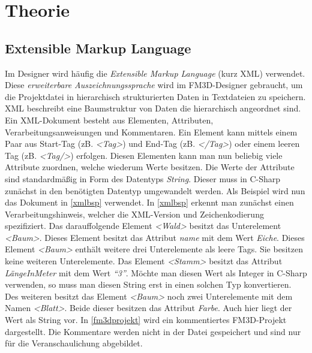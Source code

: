 \chapter{Theorie}
\label{theorie}




\section[Extensible Markup Language]{Extensible Markup Language\cite{xml}\cite{xmlcstutorials}\cite{msdn}}
\label{extensiblemarkuplanguage}

Im Designer wird häufig die \textit{Extensible Markup Language} (kurz \ac{XML}) verwendet.  Diese \textit{erweiterbare Auszeichnungssprache} wird im FM3D-Designer gebraucht, um die Projektdatei in hierarchisch strukturierten Daten in Textdateien zu speichern.
\ac{XML} beschreibt eine Baumstruktur von Daten die hierarchisch angeordnet sind. Ein \ac{XML}-Dokument besteht aus Elementen, Attributen, Verarbeitungsanweisungen und Kommentaren. 
Ein Element kann mittels einem Paar aus Start-Tag (zB. \textit{<Tag>}) und End-Tag (zB. \textit{</Tag>}) oder einem leeren Tag (zB. \textit{<Tag/>}) erfolgen.
Diesen Elementen kann man nun beliebig viele Attribute zuordnen, welche wiederum Werte besitzen.
Die Werte der Attribute sind standardmäßig in Form des Datentyps \textit{String}. Dieser muss in C-Sharp zunächst in den benötigten Datentyp umgewandelt werden.
Als Beispiel wird nun das Dokument in \cref{xmlbsp} verwendet. 
In \cref{xmlbsp} erkennt man zunächst einen Verarbeitungshinweis, welcher die XML-Version und Zeichenkodierung spezifiziert. Das darauffolgende Element \textit{<Wald>} besitzt das Unterelement \textit{<Baum>}. Dieses Element besitzt das Attribut \textit{name} mit dem Wert \textit{Eiche}. 
Dieses Element \textit{<Baum>} enthält weitere drei Unterelemente als leere Tags. Sie besitzen keine weiteren Unterelemente. Das Element \textit{<Stamm>} besitzt das Attribut \textit{LängeInMeter} mit dem Wert \textit{"`3"'}. Möchte man diesen Wert als Integer in C-Sharp verwenden, so muss man diesen String erst in einen solchen Typ konvertieren. Des weiteren besitzt das Element \textit{<Baum>} noch zwei Unterelemente mit dem Namen \textit{<Blatt>}. Beide dieser besitzen das Attribut \textit{Farbe}. Auch hier liegt der Wert als String vor.
In \cref{fm3dprojekt} wird ein kommentiertes FM3D-Projekt dargestellt. Die Kommentare werden nicht in der Datei gespeichert und sind nur für die Veranschaulichung abgebildet.
